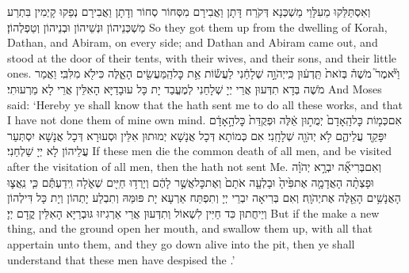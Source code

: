 {וְאִסְתַּלַּקוּ מֵעִלָּוֵי מַשְׁכְּנָא דְּקֹרַח דָּתָן וַאֲבִירָם מִסְּחוֹר סְחוֹר וְדָתָן וַאֲבִירָם נְפַקוּ קָיְמִין בִּתְרַע מַשְׁכְּנֵיהוֹן וּנְשֵׁיהוֹן וּבְנֵיהוֹן וְטַפְלְהוֹן׃}
{So they got them up from the dwelling of Korah, Dathan, and Abiram, on every side; and Dathan and Abiram came out, and stood at the door of their tents, with their wives, and their sons, and their little ones.}{}
{וַיֹּ֘אמֶר֮ מֹשֶׁה֒ בְּזֹאת֙ תֵּֽדְע֔וּן כִּֽי\maqqaf יְהֹוָ֣ה שְׁלָחַ֔נִי לַעֲשׂ֕וֹת אֵ֥ת כׇּל\maqqaf הַֽמַּעֲשִׂ֖ים הָאֵ֑לֶּה כִּי\maqqaf לֹ֖א מִלִּבִּֽי׃}
{וַאֲמַר מֹשֶׁה בְּדָא תִדְּעוּן אֲרֵי יְיָ שְׁלָחַנִי לְמֶעֱבַד יָת כָּל עוּבָדַיָּא הָאִלֵּין אֲרֵי לָא מֵרְעוּתִי׃}
{And Moses said: ‘Hereby ye shall know that the \lord\space hath sent me to do all these works, and that I have not done them of mine own mind.}{}
{אִם\maqqaf כְּמ֤וֹת כׇּל\maqqaf הָֽאָדָם֙ יְמֻת֣וּן אֵ֔לֶּה וּפְקֻדַּת֙ כׇּל\maqqaf הָ֣אָדָ֔ם יִפָּקֵ֖ד עֲלֵיהֶ֑ם לֹ֥א יְהֹוָ֖ה שְׁלָחָֽנִי׃}
{אִם כְּמוֹתָא דְּכָל אֲנָשָׁא יְמוּתוּן אִלֵּין וּסְעוּרָא דְּכָל אֲנָשָׁא יִסְתְּעַר עֲלֵיהוֹן לָא יְיָ שַׁלְחַנִי׃}
{If these men die the common death of all men, and be visited after the visitation of all men, then the \lord\space hath not sent Me.}{}
{וְאִם\maqqaf בְּרִיאָ֞ה יִבְרָ֣א יְהֹוָ֗ה וּפָצְתָ֨ה הָאֲדָמָ֤ה אֶת\maqqaf פִּ֙יהָ֙ וּבָלְעָ֤ה אֹתָם֙ וְאֶת\maqqaf כׇּל\maqqaf אֲשֶׁ֣ר לָהֶ֔ם וְיָרְד֥וּ חַיִּ֖ים שְׁאֹ֑לָה וִֽידַעְתֶּ֕ם כִּ֧י נִֽאֲצ֛וּ הָאֲנָשִׁ֥ים הָאֵ֖לֶּה אֶת\maqqaf יְהֹוָֽה׃}
{וְאִם בְּרִיאָה יִבְרֵי יְיָ וְתִפְתַּח אַרְעָא יָת פּוּמַּהּ וְתִבְלַע יָתְהוֹן וְיָת כָּל דִּילְהוֹן וְיֵיחֲתוּן כִּד חַיִּין לִשְׁאוֹל וְתִדְּעוּן אֲרֵי אַרְגִיזוּ גּוּבְרַיָּא הָאִלֵּין קֳדָם יְיָ׃}
{But if the \lord\space make a new thing, and the ground open her mouth, and swallow them up, with all that appertain unto them, and they go down alive into the pit, then ye shall understand that these men have despised the \lord.’}{}
